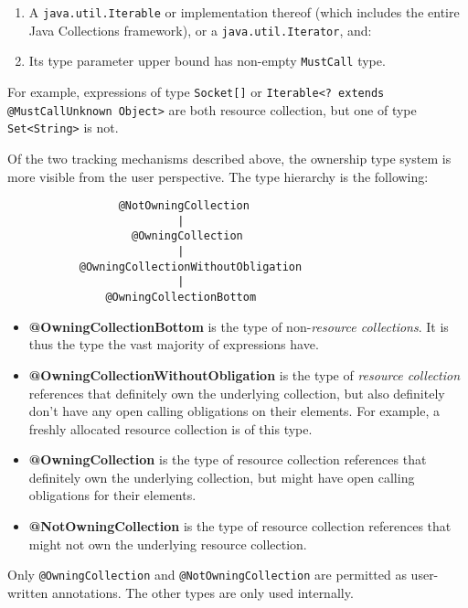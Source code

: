 \begin{enumerate}
  \item A \texttt{java.util.Iterable} or implementation thereof (which includes the entire Java Collections framework), or a \texttt{java.util.Iterator}, and:
  \item Its type parameter upper bound has non-empty \texttt{MustCall} type.
\end{enumerate}

For example, expressions of type \texttt{Socket[]} or \texttt{Iterable<? extends @MustCallUnknown Object>} are both resource collection, but one of type \texttt{Set<String>} is not.

Of the two tracking mechanisms described above, the ownership type system is more visible from the user perspective. The type hierarchy is the following:

\begin{verbatim}
                 @NotOwningCollection
                          |
                   @OwningCollection
                          |
           @OwningCollectionWithoutObligation
                          |
               @OwningCollectionBottom
\end{verbatim}

\begin{itemize}
  \item \textbf{@OwningCollectionBottom} is the type of non-\textit{resource collections}. It is thus the type the vast majority of expressions have.
  \item \textbf{@OwningCollectionWithoutObligation} is the type of \textit{resource collection} references that definitely own the underlying collection, but also definitely don't have any open calling obligations on their elements. For example, a freshly allocated resource collection is of this type.
  \item \textbf{@OwningCollection} is the type of resource collection references that definitely own the underlying collection, but might have open calling obligations for their elements.
  \item \textbf{@NotOwningCollection} is the type of resource collection references that might not own the underlying resource collection.
\end{itemize}

Only \texttt{@OwningCollection} and \texttt{@NotOwningCollection} are permitted as user-written annotations. The other types are only used internally.

